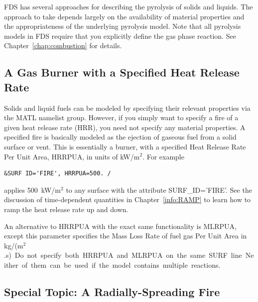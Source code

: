 \documentclass[11pt]{book}
\begin{document}
FDS has several approaches for describing the pyrolysis of solids and liquids. The approach to take depends largely
on the availability of material properties and the appropriateness of the underlying pyrolysis model.
Note that all pyrolysis models in FDS require that you explicitly define the gas phase reaction. See Chapter~\ref{chap:combustion} for details.

\subsection{A Gas Burner with a Specified Heat Release Rate}

\label{info:gas_burner}

Solids and liquid fuels can be modeled by specifying their relevant
properties via the {\ct MATL} namelist group. However, if you simply
want to specify a fire of a given heat release rate (HRR),
you need not specify any material properties. A specified fire is
basically modeled as the ejection of gaseous fuel
from a solid surface or vent. This is essentially a burner, with a
specified Heat Release Rate Per Unit Area, {\ct HRRPUA}, in units of
kW/m$^2$. For example
\begin{lstlisting}
&SURF ID='FIRE', HRRPUA=500. /
\end{lstlisting}
applies 500~kW/m$^2$ to any surface with the attribute
{\ct SURF\_ID='FIRE'}. See the discussion of time-dependent quantities
in Chapter~\ref{info:RAMP} to learn how to ramp the heat release rate up and down.

An alternative to {\ct HRRPUA} with the exact same functionality is {\ct MLRPUA}, except this parameter
specifies the Mass Loss Rate of fuel gas Per Unit Area in \si{kg/(m$^2$.s)}. Do not specify both
{\ct HRRPUA} and {\ct MLRPUA} on the same {\ct SURF} line.  Neither of them can be used if the model contains multiple reactions.







\subsection{Special Topic: A Radially-Spreading Fire}
\label{info:spread}
\end{document}
